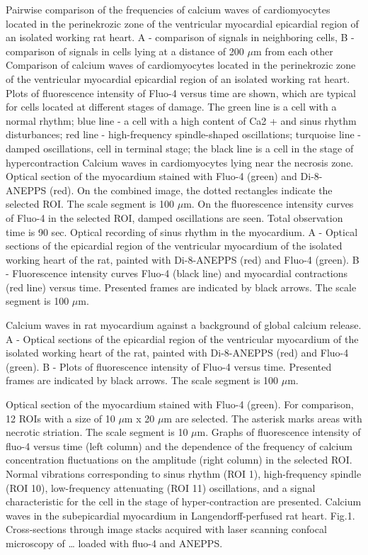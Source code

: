 \documentclass[a4paper,12pt]{article}
\begin{document}
Pairwise comparison of the frequencies of calcium waves of cardiomyocytes located in the perinekrozic zone of the ventricular myocardial epicardial region of an isolated working rat heart. A - comparison of signals in neighboring cells, B - comparison of signals in cells lying at a distance of 200 $\mu$m from each other
Comparison of calcium waves of cardiomyocytes located in the perinekrozic zone of the ventricular myocardial epicardial region of an isolated working rat heart. Plots of fluorescence intensity of Fluo-4 versus time are shown, which are typical for cells located at different stages of damage. The green line is a cell with a normal rhythm; blue line - a cell with a high content of Ca2 + and sinus rhythm disturbances; red line - high-frequency spindle-shaped oscillations; turquoise line - damped oscillations, cell in terminal stage; the black line is a cell in the stage of hypercontraction
Calcium waves in cardiomyocytes lying near the necrosis zone. Optical section of the myocardium stained with Fluo-4 (green) and Di-8-ANEPPS (red). On the combined image, the dotted rectangles indicate the selected ROI. The scale segment is 100 $\mu$m. On the fluorescence intensity curves of Fluo-4 in the selected ROI, damped oscillations are seen. Total observation time is 90 sec.
Optical recording of sinus rhythm in the myocardium. A - Optical sections of the epicardial region of the ventricular myocardium of the isolated working heart of the rat, painted with Di-8-ANEPPS (red) and Fluo-4 (green). B - Fluorescence intensity curves Fluo-4 (black line) and myocardial contractions (red line) versus time. Presented frames are indicated by black arrows. The scale segment is 100 $\mu$m.

Calcium waves in rat myocardium against a background of global calcium release. A - Optical sections of the epicardial region of the ventricular myocardium of the isolated working heart of the rat, painted with Di-8-ANEPPS (red) and Fluo-4 (green). B - Plots of fluorescence intensity of Fluo-4 versus time. Presented frames are indicated by black arrows. The scale segment is 100 $\mu$m.

Optical section of the myocardium stained with Fluo-4 (green). For comparison, 12 ROIs with a size of 10 $\mu$m x 20 $\mu$m are selected. The asterisk marks areas with necrotic striation. The scale segment is 10 $\mu$m.
Graphs of fluorescence intensity of fluo-4 versus time (left column) and the dependence of the frequency of calcium concentration fluctuations on the amplitude (right column) in the selected ROI. Normal vibrations corresponding to sinus rhythm (ROI 1), high-frequency spindle (ROI 10), low-frequency attenuating (ROI 11) oscillations, and a signal characteristic for the cell in the stage of hyper-contraction are presented.
Calcium waves in the subepicardial myocardium in Langendorff-perfused rat heart. Fig.1. Cross-sections through image stacks acquired with laser scanning confocal microscopy of … loaded with fluo-4 and ANEPPS.
\end{document}
